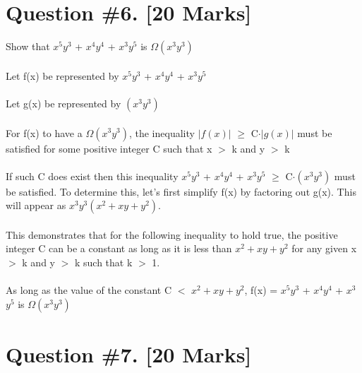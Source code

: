 \documentclass{article}
\begin{document}
\section{Question \#6. [20 Marks]}
Show that $x^5$$y^3$ + $x^4$$y^4$ + $x^3$$y^5$ is $\Omega(x^3y^3)$ \\ \\
Let f(x) be represented by $x^5$$y^3$ + $x^4$$y^4$ + $x^3$$y^5$ \\ \\
Let g(x) be represented by $(x^3y^3)$ \\\\
For f(x) to have a $\Omega(x^3y^3)$, the inequality $\left| f(x) \right|$ $\geq$ C$\cdot$$\left| g(x) \right|$ must be satisfied for some positive integer C such that x $>$ k and y $>$ k \\ \\ 
If such C does exist then this inequality $x^5$$y^3$ + $x^4$$y^4$ + $x^3$$y^5$ $\geq$ C$\cdot (x^3y^3)$ must be satisfied. To determine this, let's first simplify f(x) by factoring out g(x).  This will appear as  
$x^3y^3 (x^2 +xy + y^2)$. \\ \\
This demonstrates that for the following inequality to hold true, the positive integer C can be a constant as long as it is less than  $x^2 +xy + y^2$ for any given x $>$ k and y $>$ k such that k $>$ 1.  \\\\
As long as the value of the constant C $<$  $x^2 +xy + y^2$, f(x) = $x^5$$y^3$ + $x^4$$y^4$ + $x^3$$y^5$ is $\Omega(x^3y^3)$
\newpage
\section{Question \#7. [20 Marks]}
\end{document}
